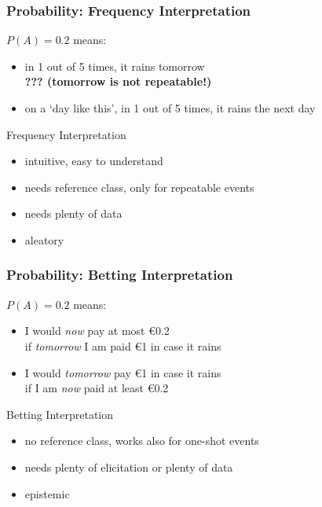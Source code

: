 \documentclass{beamer}
\newcommand{\gplus}{\structure{\textbf{+}}}
\newcommand{\gmins}{\structure{\textbf{--}}}
\newcommand{\gexcl}{\structure{\rule{0.3ex}{0ex}\textbf{!}\rule{0.3ex}{0ex}}}
\begin{document}
\begin{frame}
  \frametitle{Probability: Frequency Interpretation}
  $P(A)=0.2$ means:
  \begin{itemize}
  \item in 1 out of 5 times, it rains tomorrow \\
    \textbf{??? (tomorrow is not repeatable!)}
  \item on a `day like this', in 1 out of 5 times, it rains the next day
  \end{itemize}
  \begin{block}{Frequency Interpretation}
    \begin{itemize}
    \item[\gplus] intuitive, easy to understand
    \item[\gmins] needs \alert{reference class}, only for \alert{repeatable events}
    \item[\gmins] needs plenty of data
    \item[\gexcl] aleatory
    \end{itemize}
  \end{block}
\end{frame}

\begin{frame}
  \frametitle{Probability: Betting Interpretation}
  $P(A)=0.2$ means:
  \begin{itemize}
  \item I would \textit{now} pay at most \euro 0.2 \\
    if \textit{tomorrow} I am paid \euro 1 in case it rains
  \item I would \textit{tomorrow} pay \euro 1 in case it rains \\
    if I am \textit{now} paid at least \euro 0.2
  \end{itemize}
  \begin{center}
  \end{center}
  \begin{block}{Betting Interpretation}
    \begin{itemize}
    \item[\gplus] no reference class, works also for \alert{one-shot events}
    \item[\gmins] needs plenty of elicitation or plenty of data
    \item[\gexcl] epistemic
    \end{itemize}
  \end{block}
\end{frame}
\end{document}
